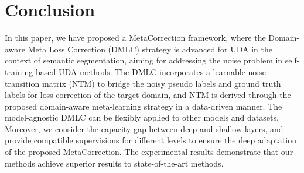 \documentclass[final]{cvpr}
\begin{document}
\section{Conclusion}
\vspace{-0.1cm}
In this paper, we have proposed a MetaCorrection framework, where the Domain-aware Meta Loss Correction (DMLC) strategy is advanced for UDA in the context of semantic segmentation, aiming for addressing the noise problem in self-training based UDA methods. The DMLC incorporates a learnable noise transition matrix (NTM) to bridge the noisy pseudo labels and ground truth labels for loss correction of the target domain, and NTM is derived through the proposed domain-aware meta-learning strategy in a data-driven manner. The model-agnostic DMLC can be flexibly applied to other models and datasets. Moreover, we consider the capacity gap between deep and shallow layers, and provide compatible supervisions for different levels to ensure the deep adaptation of the proposed MetaCorrection. The experimental results demonstrate that our methods achieve superior results to state-of-the-art methods.


{\small


}
\end{document}
